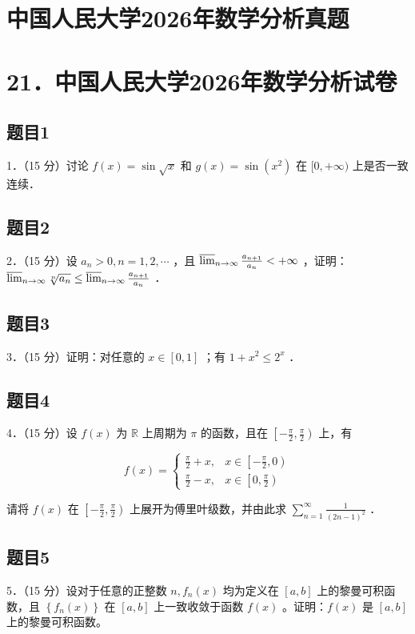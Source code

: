 \documentclass{article}
\begin{document}
\section*{中国人民大学2026年数学分析真题}
\section*{21．中国人民大学2026年数学分析试卷}

\subsection{题目1}
1．（15 分）讨论 \(f(x)=\sin \sqrt{x}\) 和 \(g(x)=\sin \left(x^{2}\right)\) 在 \([0,+\infty)\) 上是否一致连续．

\subsection{题目2}
2．（15 分）设 \(a_{n}>0, n=1,2, \cdots\) ，且 \(\varlimsup_{n \rightarrow \infty} \frac{a_{n+1}}{a_{n}}<+\infty\) ，证明：\(\varlimsup_{n \rightarrow \infty} \sqrt[n]{a_{n}} \leq \varlimsup_{n \rightarrow \infty} \frac{a_{n+1}}{a_{n}}\) ．

\subsection{题目3}
3．（15 分）证明：对任意的 \(x \in[0,1]\) ；有 \(1+x^{2} \leq 2^{x}\) ．

\subsection{题目4}
4．（15 分）设 \(f(x)\) 为 \(\mathbb{R}\) 上周期为 \(\pi\) 的函数，且在 \(\left[-\frac{\pi}{2}, \frac{\pi}{2}\right)\) 上，有

\[
f(x)= \begin{cases}\frac{\pi}{2}+x, & x \in\left[-\frac{\pi}{2}, 0\right) \\ \frac{\pi}{2}-x, & x \in\left[0, \frac{\pi}{2}\right)\end{cases}
\]

请将 \(f(x)\) 在 \(\left[-\frac{\pi}{2}, \frac{\pi}{2}\right)\) 上展开为傅里叶级数，并由此求 \(\sum_{n=1}^{\infty} \frac{1}{(2 n-1)^{2}}\) ．

\subsection{题目5}
5．（15 分）设对于任意的正整数 \(n, f_{n}(x)\) 均为定义在 \([a, b]\) 上的黎曼可积函数，且 \(\left\{f_{n}(x)\right\}\) 在 \([a, b]\) 上一致收敛于函数 \(f(x)\) 。证明：\(f(x)\) 是 \([a, b]\) 上的黎曼可积函数。
\end{document}
